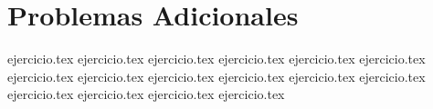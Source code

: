 
\section*{Problemas Adicionales}

\begin{enumerate}
    {ejercicio.tex}
{ejercicio.tex}
{ejercicio.tex}
{ejercicio.tex}
{ejercicio.tex}
{ejercicio.tex}
{ejercicio.tex}
{ejercicio.tex}
{ejercicio.tex}
{ejercicio.tex}
{ejercicio.tex}
{ejercicio.tex}
{ejercicio.tex}
{ejercicio.tex}
{ejercicio.tex}
{ejercicio.tex}
\end{enumerate}
